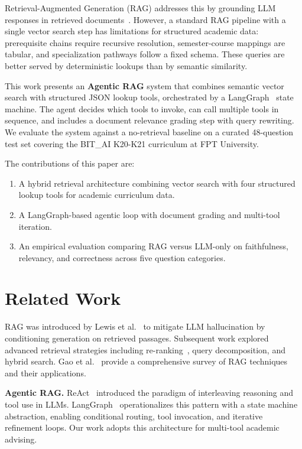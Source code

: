 \documentclass[lettersize,journal]{IEEEtran}
\begin{document}
Retrieval-Augmented Generation (RAG) addresses this by grounding LLM responses in retrieved documents~\cite{ref_lewis_rag}. However, a standard RAG pipeline with a single vector search step has limitations for structured academic data: prerequisite chains require recursive resolution, semester-course mappings are tabular, and specialization pathways follow a fixed schema. These queries are better served by deterministic lookups than by semantic similarity.

This work presents an \textbf{Agentic RAG} system that combines semantic vector search with structured JSON lookup tools, orchestrated by a LangGraph~\cite{ref_langgraph} state machine. The agent decides which tools to invoke, can call multiple tools in sequence, and includes a document relevance grading step with query rewriting. We evaluate the system against a no-retrieval baseline on a curated 48-question test set covering the BIT\_AI K20-K21 curriculum at FPT University.

The contributions of this paper are:
\begin{enumerate}
    \item A hybrid retrieval architecture combining vector search with four structured lookup tools for academic curriculum data.
    \item A LangGraph-based agentic loop with document grading and multi-tool iteration.
    \item An empirical evaluation comparing RAG versus LLM-only on faithfulness, relevancy, and correctness across five question categories.
\end{enumerate}

\section{Related Work}

RAG was introduced by Lewis et al.~\cite{ref_lewis_rag} to mitigate LLM hallucination by conditioning generation on retrieved passages. Subsequent work explored advanced retrieval strategies including re-ranking~\cite{ref_reranking}, query decomposition, and hybrid search. Gao et al.~\cite{ref_rag_survey} provide a comprehensive survey of RAG techniques and their applications.

\textbf{Agentic RAG.} ReAct~\cite{ref_react} introduced the paradigm of interleaving reasoning and tool use in LLMs. LangGraph~\cite{ref_langgraph} operationalizes this pattern with a state machine abstraction, enabling conditional routing, tool invocation, and iterative refinement loops. Our work adopts this architecture for multi-tool academic advising.
\end{document}
